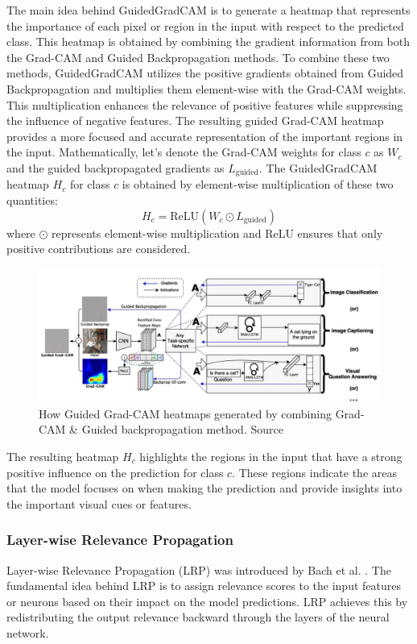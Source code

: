 The main idea behind GuidedGradCAM is to generate a heatmap that represents the importance of each pixel or region in the input with respect to the predicted class. This heatmap is obtained by combining the gradient information from both the Grad-CAM and Guided Backpropagation methods. To combine these two methods, GuidedGradCAM utilizes the positive gradients obtained from Guided Backpropagation and multiplies them element-wise with the Grad-CAM weights. This multiplication enhances the relevance of positive features while suppressing the influence of negative features. The resulting guided Grad-CAM heatmap provides a more focused and accurate representation of the important regions in the input.
Mathematically, let's denote the Grad-CAM weights for class $c$ as $W_c$ and the guided backpropagated gradients as $L_{\text{guided}}$. The GuidedGradCAM heatmap $H_c$ for class $c$ is obtained by element-wise multiplication of these two quantities:
\begin{equation}
H_c = \text{ReLU}(W_c \odot L_{\text{guided}})
\end{equation}
where $\odot$ represents element-wise multiplication and ReLU ensures that only positive contributions are considered.

\begin{figure}[ht]
\centering
\includegraphics[width=13cm]{images/xai_methods/guided-grad-cam.png}
\caption{How Guided Grad-CAM heatmaps generated by combining Grad-CAM \& Guided backpropagation method. Source \cite{grad_cam}}
\end{figure}

The resulting heatmap $H_c$ highlights the regions in the input that have a strong positive influence on the prediction for class $c$. These regions indicate the areas that the model focuses on when making the prediction and provide insights into the important visual cues or features.

\subsubsection{Layer-wise Relevance Propagation}
\label{subsubsec:lrp}
Layer-wise Relevance Propagation (LRP) was introduced by Bach et al. \cite{lrp}. The fundamental idea behind LRP is to assign relevance scores to the input features or neurons based on their impact on the model predictions. LRP achieves this by redistributing the output relevance backward through the layers of the neural network.

